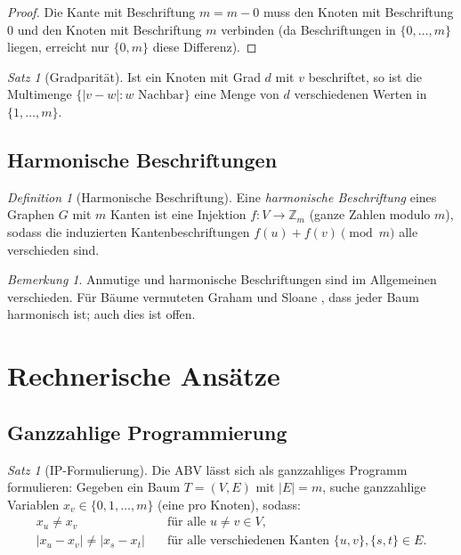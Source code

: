 \documentclass[12pt,a4paper]{amsart}
\theoremstyle{definition}
\theoremstyle{remark}
\newtheorem{satz}[theorem]{Satz}
\newtheorem{bemerkung}[theorem]{Bemerkung}
\newtheorem{definition_de}[theorem]{Definition}
\newcommand{\Z}{\mathbb{Z}}
\begin{document}
\begin{proof}
Die Kante mit Beschriftung $m = m - 0$ muss den Knoten mit Beschriftung $0$ und
den Knoten mit Beschriftung $m$ verbinden (da Beschriftungen in $\{0, \ldots, m\}$
liegen, erreicht nur $\{0, m\}$ diese Differenz).
\end{proof}

\begin{satz}[Gradparität]\label{satz:grad_parität}
Ist ein Knoten mit Grad $d$ mit $v$ beschriftet, so ist die Multimenge
$\{|v - w| : w \text{ Nachbar}\}$ eine Menge von $d$ verschiedenen Werten in
$\{1, \ldots, m\}$.
\end{satz}

\subsection{Harmonische Beschriftungen}

\begin{definition_de}[Harmonische Beschriftung]
Eine \emph{harmonische Beschriftung} eines Graphen $G$ mit $m$ Kanten ist eine
Injektion $f: V \to \Z_m$ (ganze Zahlen modulo $m$), sodass die induzierten
Kantenbeschriftungen $f(u) + f(v) \pmod m$ alle verschieden sind.
\end{definition_de}

\begin{bemerkung}
Anmutige und harmonische Beschriftungen sind im Allgemeinen verschieden. Für Bäume
vermuteten Graham und Sloane \cite{GrahamSloane1980}, dass jeder Baum harmonisch ist;
auch dies ist offen.
\end{bemerkung}

\section{Rechnerische Ansätze}\label{sec:rechnerisch}

\subsection{Ganzzahlige Programmierung}

\begin{satz}[IP-Formulierung]\label{satz:ip}
Die ABV lässt sich als ganzzahliges Programm formulieren: Gegeben ein Baum
$T = (V, E)$ mit $|E| = m$, suche ganzzahlige Variablen
$x_v \in \{0, 1, \ldots, m\}$ (eine pro Knoten), sodass:
\begin{align*}
  x_u \neq x_v & \quad \text{für alle } u \neq v \in V, \\
  |x_u - x_v| \neq |x_s - x_t| & \quad \text{für alle verschiedenen Kanten }
  \{u,v\}, \{s,t\} \in E.
\end{align*}
\end{satz}
\end{document}
